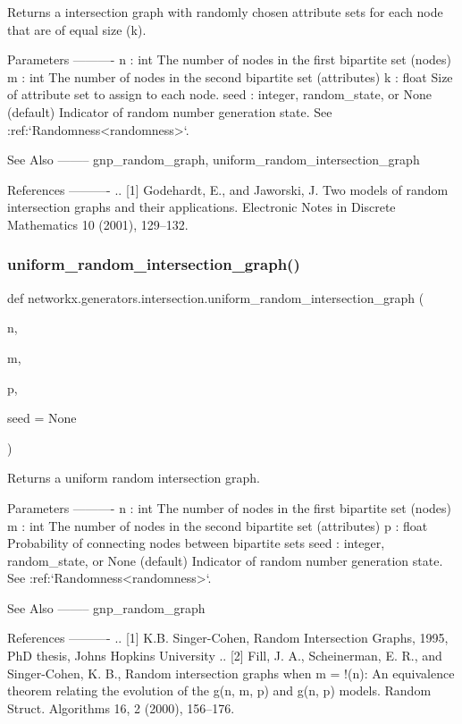 \begin{DoxyVerb}Returns a intersection graph with randomly chosen attribute sets for
each node that are of equal size (k).

Parameters
----------
n : int
    The number of nodes in the first bipartite set (nodes)
m : int
    The number of nodes in the second bipartite set (attributes)
k : float
    Size of attribute set to assign to each node.
seed : integer, random_state, or None (default)
    Indicator of random number generation state.
    See :ref:`Randomness<randomness>`.

See Also
--------
gnp_random_graph, uniform_random_intersection_graph

References
----------
.. [1] Godehardt, E., and Jaworski, J.
   Two models of random intersection graphs and their applications.
   Electronic Notes in Discrete Mathematics 10 (2001), 129--132.
\end{DoxyVerb}
 \mbox{\label{namespacenetworkx_1_1generators_1_1intersection_aa7d0bd0aa5c472794142b0abe0386590}} 
\subsubsection{\texorpdfstring{uniform\+\_\+random\+\_\+intersection\+\_\+graph()}{uniform\_random\_intersection\_graph()}}
{\footnotesize\ttfamily def networkx.\+generators.\+intersection.\+uniform\+\_\+random\+\_\+intersection\+\_\+graph (\begin{DoxyParamCaption}\item[{}]{n,  }\item[{}]{m,  }\item[{}]{p,  }\item[{}]{seed = {\ttfamily None} }\end{DoxyParamCaption})}

\begin{DoxyVerb}Returns a uniform random intersection graph.

Parameters
----------
n : int
    The number of nodes in the first bipartite set (nodes)
m : int
    The number of nodes in the second bipartite set (attributes)
p : float
    Probability of connecting nodes between bipartite sets
seed : integer, random_state, or None (default)
    Indicator of random number generation state.
    See :ref:`Randomness<randomness>`.

See Also
--------
gnp_random_graph

References
----------
.. [1] K.B. Singer-Cohen, Random Intersection Graphs, 1995,
   PhD thesis, Johns Hopkins University
.. [2] Fill, J. A., Scheinerman, E. R., and Singer-Cohen, K. B.,
   Random intersection graphs when m = !(n):
   An equivalence theorem relating the evolution of the g(n, m, p)
   and g(n, p) models. Random Struct. Algorithms 16, 2 (2000), 156–176.
\end{DoxyVerb}
 